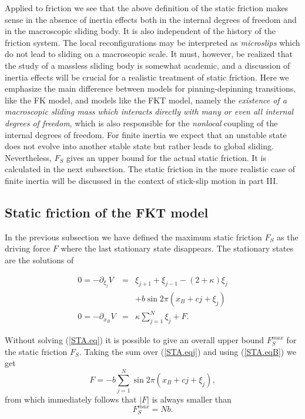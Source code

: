 Applied to friction we see that the above definition of the static
friction makes sense in the absence of inertia effects both in the
internal degrees of freedom and in the macroscopic sliding body. It
is also independent of the history of the friction system. The local
reconfigurations may be interpreted as {\em
microslips\/}\cite{rab.65} which do not lead to sliding on a
macroscopic scale. It must, however, be realized that the study of a
massless sliding body is somewhat academic, and a discussion of
inertia effects will be crucial for a realistic treatment of static
friction. Here we emphasize the main difference between models for
pinning-depinning transitions, like the FK model, and models like the
FKT model, namely the {\em existence of a macroscopic sliding mass
which interacts directly with many or even all internal degrees of
freedom\/}, which is also responsible for the {\em nonlocal\/}
coupling of the internal degrees of freedom. For finite inertia we
expect that an unstable state does not evolve into another stable
state but rather leads to global sliding. Nevertheless, $F_S$ gives
an upper bound for the actual static friction. It is calculated in the
next subsection. The static friction in the more realistic case of
finite inertia will be discussed in the context of stick-slip motion
in part III.

\subsection{\protect\label{STA2}Static friction of the FKT model}

In the previous subsection we have defined the maximum static
friction $F_S$ as the driving force $F$ where the last stationary
state disappears. The stationary states are the solutions of
\begin{mathletters}
\label{STA.eq}
\begin{eqnarray}
 0=-\partial_{\xi_j}V&=&\xi_{j+1}+\xi_{j-1}-(2+\kappa)\xi_j
   \nonumber\\&&+b\sin 2\pi(x_B+cj+\xi_j) \label{STA.eqj}\\
 0=-\partial_{x_B}V&=&\kappa\sum_{j=1}^N\xi_j+F\label{STA.eqB}.
\end{eqnarray}
\end{mathletters}

Without solving (\ref{STA.eq}) it is possible to give an overall upper
bound $F_S^{max}$ for the static friction $F_S$.  Taking the sum over
(\ref{STA.eqj}) and using (\ref{STA.eqB}) we get 
\begin{equation}
  F=-b\sum_{j=1}^N\sin 2\pi(x_B+cj+\xi_j),
  \label{STA.F}
\end{equation}
from which immediately follows that $|F|$ is always smaller than
\begin{equation}
  F_S^{max}=Nb.
  \label{STA.FSmax}
\end{equation}


